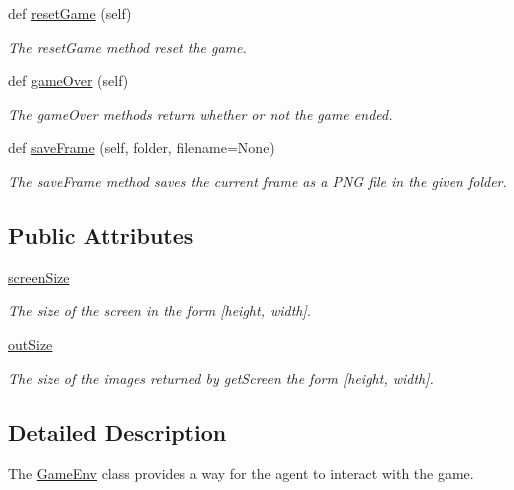 \begin{DoxyCompactItemize}
def \hyperlink{classDQN-Deepmind-NIPS-2013_1_1GameEnv_1_1GameEnv_afc780b83378b9d19d9dba64711e5c2ed}{reset\+Game} (self)
\begin{DoxyCompactList}\small\item\em The reset\+Game method reset the game. \end{DoxyCompactList}\item 
def \hyperlink{classDQN-Deepmind-NIPS-2013_1_1GameEnv_1_1GameEnv_a1ccc35e029e05910c3c25ffa602e442b}{game\+Over} (self)
\begin{DoxyCompactList}\small\item\em The game\+Over methods return whether or not the game ended. \end{DoxyCompactList}\item 
def \hyperlink{classDQN-Deepmind-NIPS-2013_1_1GameEnv_1_1GameEnv_aed0bd85608c8373dd1ccfb27b9ae79bf}{save\+Frame} (self, folder, filename=None)
\begin{DoxyCompactList}\small\item\em The save\+Frame method saves the current frame as a P\+NG file in the given folder. \end{DoxyCompactList}\end{DoxyCompactItemize}
\subsection*{Public Attributes}
\begin{DoxyCompactItemize}
\item 
\hyperlink{classDQN-Deepmind-NIPS-2013_1_1GameEnv_1_1GameEnv_a2dedb2f4e5f0f1b7da2970ac89a5b544}{screen\+Size}
\begin{DoxyCompactList}\small\item\em The size of the screen in the form \mbox{[}height, width\mbox{]}. \end{DoxyCompactList}\item 
\hyperlink{classDQN-Deepmind-NIPS-2013_1_1GameEnv_1_1GameEnv_ae8e7e56bd996ea0ce4ece1ca32f6b54a}{out\+Size}
\begin{DoxyCompactList}\small\item\em The size of the images returned by get\+Screen the form \mbox{[}height, width\mbox{]}. \end{DoxyCompactList}\end{DoxyCompactItemize}


\subsection{Detailed Description}
The \hyperlink{classDQN-Deepmind-NIPS-2013_1_1GameEnv_1_1GameEnv}{Game\+Env} class provides a way for the agent to interact with the game. 

